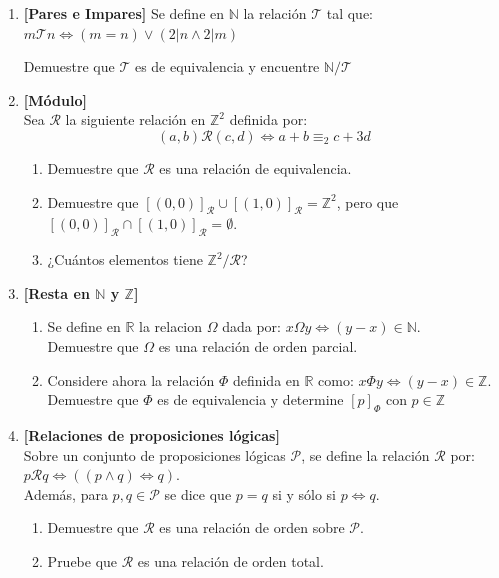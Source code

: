 \documentclass[letterpaper,10pt]{article}
\newcommand{\R}{\mathbb R}
\newcommand{\N}{\mathbb N}
\newcommand{\Z}{\mathbb Z}
\newcommand{\ssi}{\Longleftrightarrow} %
\theoremstyle{plain}
\begin{document}
\begin{enumerate}[\bf P1.]
    \item \textbf{[Pares e Impares]} Se define en $\N$ la relación $\mathcal{T}$ tal que: $ m\mathcal{T}n \ssi (m=n) \lor (2|n \land 2|m)$
    
    Demuestre que $\mathcal{T}$ es de equivalencia y encuentre $\N/\mathcal{T}$
    
    \item \textbf{[Módulo]} \\
        Sea $\mathcal{R}$ la siguiente relación en $\Z^2$ definida por:
        $$
        (a,b) \mathcal{R} (c,d) \iff  a+b \equiv_2 c+3d
        $$
        \begin{enumerate}
	        \item Demuestre que $\mathcal{R}$ es una relación de equivalencia.
	        \item Demuestre que $[(0,0)]_\mathcal{R}\cup  [(1,0)]_\mathcal{R}=\Z^2$, pero que $[(0,0)]_\mathcal{R} \cap [(1,0)]_\mathcal{R}=\emptyset$.
	        \item ¿Cuántos elementos tiene $\Z^2 /\mathcal{R}$?
        \end{enumerate}
    \item \textbf{[Resta en $\N$ y $\Z$]}
        \begin{enumerate}
            \item Se define en $\R$ la relacion $\Omega$ dada por: $x \Omega y \Leftrightarrow (y-x) \in \N$.\\ Demuestre que $\Omega$ es una relación de orden parcial.
        
            \item Considere ahora la relación $\Phi$ definida en $\R$ como: $x \Phi y \Leftrightarrow (y-x) \in \Z$.\\
            Demuestre que $\Phi$ es de equivalencia y determine $[p]_{\Phi}$ con $p \in \Z$
        \end{enumerate}
        
    \item\textbf{[Relaciones de proposiciones lógicas]} \\Sobre un conjunto de proposiciones lógicas $\mathcal{P}$, se define la relación $\mathcal{R}$ por: $p\mathcal{R}q \Leftrightarrow ((p\wedge q)\Leftrightarrow q).$\\ Además, para $p,q\in\mathcal{P}$ se dice que $p=q$ si y sólo si $p\Leftrightarrow q$.
        \begin{enumerate}
	        \item Demuestre que $\mathcal{R}$ es una relación de orden sobre $\mathcal{P}$.
	        \item Pruebe que $\mathcal{R}$ es una relación de orden total.
        \end{enumerate}
    

\end{enumerate}
\end{document}
